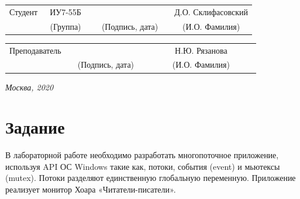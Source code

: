 \documentclass[14pt, a4paper]{extarticle}
\begin{document}
\noindent
{}
\\


\noindent
{}
\\

\vspace{1.5cm}
\noindent
\begin{tabular}{l c c c c c}
	Студент      & ~ИУ7-55Б~               & \hspace{2.5cm} & \hspace{2cm}                 & &  Д.О. Склифасовский \\\cline{2-2}\cline{4-4} \cline{6-6} 
	\hspace{3cm} & {\footnotesize(Группа)} &                & {\footnotesize(Подпись, дата)} & & {\footnotesize(И.О. Фамилия)}
\end{tabular}

\noindent
\begin{tabular}{l c c c c}
	Преподаватель & \hspace{5cm}   & \hspace{2cm}                 & & ~~~~~~Н.Ю. Рязанова~~~~~~\\\cline{3-3} \cline{5-5} 
	\hspace{3cm}  &                & {\footnotesize(Подпись, дата)} & & {\footnotesize(И.О. Фамилия)}
\end{tabular}

\vspace{0.6cm}
\begin{center}	
	\vfill
	\large \textit {Москва, 2020}
\end{center}

\thispagestyle {empty}
\pagebreak

\clearpage
\section*{Задание}
В лабораторной работе необходимо разработать многопоточное приложение, используя API ОС Windows такие как, потоки, события (event) и мьютексы (mutex). Потоки разделяют единственную глобальную переменную. Приложение реализует монитор Хоара «Читатели-писатели».\par
\end{document}
